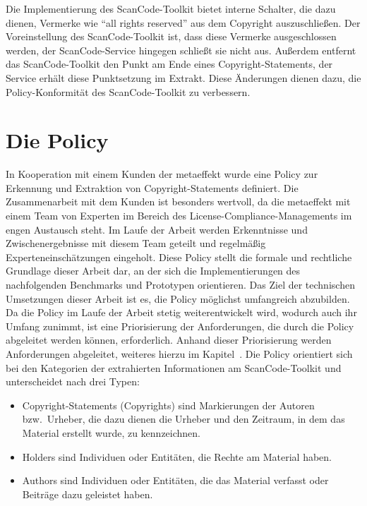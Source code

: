 Die Implementierung des ScanCode-Toolkit bietet interne Schalter, die dazu dienen, Vermerke wie \enquote{all rights reserved} aus dem Copyright auszuschließen.
Der Voreinstellung des ScanCode-Toolkit ist, dass diese Vermerke ausgeschlossen werden, der ScanCode-Service hingegen schließt sie nicht aus.
Außerdem entfernt das ScanCode-Toolkit den Punkt am Ende eines Copyright-Statements, der Service erhält diese Punktsetzung im Extrakt.
Diese Änderungen dienen dazu, die Policy-Konformität des ScanCode-Toolkit zu verbessern\autocite{noauthor_metaeffekt-scancode-service_2025}.


\section{Die Policy}\label{sec:policy}

In Kooperation mit einem Kunden der metaeffekt wurde eine Policy zur Erkennung und Extraktion von Copyright-Statements definiert.
Die Zusammenarbeit mit dem Kunden ist besonders wertvoll, da die metaeffekt mit einem Team von Experten im Bereich des License-Compliance-Managements im engen Austausch steht.
Im Laufe der Arbeit werden Erkenntnisse und Zwischenergebnisse mit diesem Team geteilt und regelmäßig Experteneinschätzungen eingeholt.
Diese Policy stellt die formale und rechtliche Grundlage dieser Arbeit dar, an der sich die Implementierungen des nachfolgenden Benchmarks und Prototypen orientieren.
Das Ziel der technischen Umsetzungen dieser Arbeit ist es, die Policy möglichst umfangreich abzubilden.
Da die Policy im Laufe der Arbeit stetig weiterentwickelt wird, wodurch auch ihr Umfang zunimmt, ist eine Priorisierung der Anforderungen, die durch die Policy abgeleitet werden können, erforderlich.
Anhand dieser Priorisierung werden Anforderungen abgeleitet, weiteres hierzu im Kapitel~.
Die Policy orientiert sich bei den Kategorien der extrahierten Informationen am ScanCode-Toolkit und unterscheidet nach drei Typen:
\begin{itemize}
    \item Copyright-Statements (Copyrights) sind Markierungen der Autoren bzw.\ Urheber, die dazu dienen die Urheber und den Zeitraum, in dem das Material erstellt wurde, zu kennzeichnen.
    \item Holders sind Individuen oder Entitäten, die Rechte am Material haben.
    \item Authors sind Individuen oder Entitäten, die das Material verfasst oder Beiträge dazu geleistet haben.
\end{itemize}

